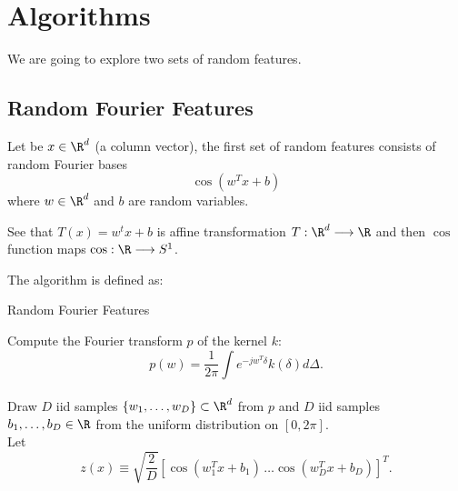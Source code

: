 \chapter{Algorithms}


We are going to explore two sets of random features. 

\section{Random Fourier Features}

Let be $x \in \R^d$  (a column vector), the first set of random features consists of random 
Fourier bases
\begin{equation}
    \cos(w^T x + b) 
\end{equation}
where $w \in \R^d$  and $b$ are random variables. 

See that $T(x) = w^t x +b$ is affine transformation
$T:\R^d \longrightarrow \R$  and then $\cos$ function maps
$\cos: \R  \longrightarrow S^1$. 

The algorithm is defined as: 

\begin{algorithm}[hbt!]
    \caption{Random Fourier Features}\label{alg:two}

     Compute the Fourier transform $p$ of the kernel $k$: 
    \begin{equation}\label{eq:fourier_transformation}
        p(w) = \frac{1}{2 \pi}
        \int
        e^{-jw^T \delta}k(\delta) 
        d \Delta. 
     \end{equation}
        \\
     Draw $D$ iid samples 
     $\{w_1, \ldots, w_D \} \subset \R^d$ from $p$ and
     $D$ iid samples $b_1, \ldots, b_D \in \R$
     from the uniform distribution on 
     $[0, 2\pi]$. 
     \\
     Let 
     \begin{equation}
        z(x)
        \equiv
        \sqrt{\frac{2}{D}}
        \left[ 
            \cos(w_1^T x + b_1) 
            \, 
            \ldots
            \cos(w_D^T x + b_D) 
            \right]^T. 
     \end{equation}
    \end{algorithm}


